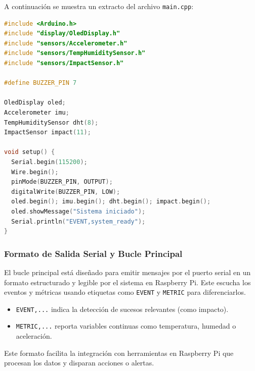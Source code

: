 \documentclass[conference]{IEEEtran}
\begin{document}
A continuación se muestra un extracto del archivo \texttt{main.cpp}:

\begin{lstlisting}[language=C++, caption={Fragmento de código fuente de Arduino}, label={lst:arduino_code}, basicstyle=\ttfamily\small, breaklines=true]
#include <Arduino.h>
#include "display/OledDisplay.h"
#include "sensors/Accelerometer.h"
#include "sensors/TempHumiditySensor.h"
#include "sensors/ImpactSensor.h"

#define BUZZER_PIN 7

OledDisplay oled;
Accelerometer imu;
TempHumiditySensor dht(8);
ImpactSensor impact(11);

void setup() {
  Serial.begin(115200);
  Wire.begin();
  pinMode(BUZZER_PIN, OUTPUT);
  digitalWrite(BUZZER_PIN, LOW);
  oled.begin(); imu.begin(); dht.begin(); impact.begin();
  oled.showMessage("Sistema iniciado");
  Serial.println("EVENT,system_ready");
}
\end{lstlisting}

\subsubsection{Formato de Salida Serial y Bucle Principal}

El bucle principal está diseñado para emitir mensajes por el puerto serial en un formato estructurado y legible por el sistema en Raspberry Pi. Este escucha los eventos y métricas usando etiquetas como \texttt{EVENT} y \texttt{METRIC} para diferenciarlos.

\begin{itemize}
  \item \texttt{EVENT,...} indica la detección de sucesos relevantes (como impacto).
  \item \texttt{METRIC,...} reporta variables continuas como temperatura, humedad o aceleración.
\end{itemize}

Este formato facilita la integración con herramientas en Raspberry Pi que procesan los datos y disparan acciones o alertas.
\end{document}
